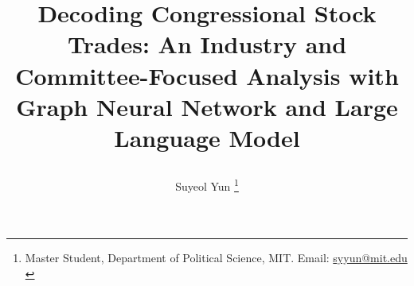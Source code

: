 \documentclass[15pt,letterpaper]{article}
\newcommand{\tit}{
\Large \bf
Decoding Congressional Stock Trades: An Industry and Committee-Focused Analysis with Graph Neural Network and Large Language Model
}
\begin{document}
{\title{
    \tit
  }
  \author{
    Suyeol Yun
  \thanks{Master Student, Department of Political Science, MIT. Email: \href{mailto:syyun@mit.edu}{syyun@mit.edu}\\
  }
  }
  \maketitle
}

\thispagestyle{empty}
\vspace{-.1in}

\begin{abstract}
  \thispagestyle{plain}
  \setcounter{page}{2}



\end{abstract}
\end{document}
